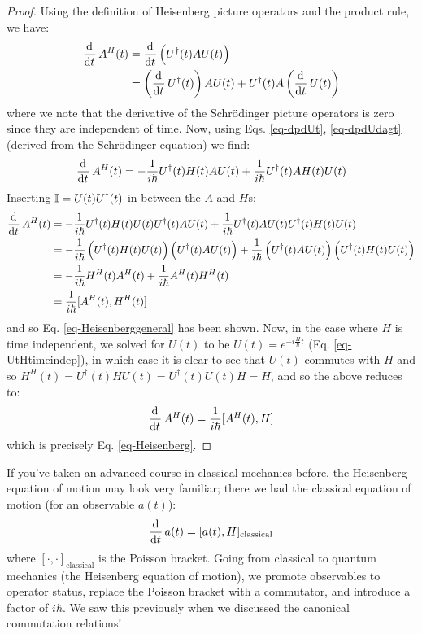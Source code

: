 \begin{proof}
    Using the definition of Heisenberg picture operators and the product rule, we have:
    \begin{equation}
        \begin{split}
            \dod{}{t}A^H(t) &= \dod{}{t}\left(U^\dag(t) A U(t)\right)
            \\ &= \left(\dod{}{t}U^\dag(t)\right)A U(t) + U^\dag(t) A \left(\dod{}{t}U(t)\right)
        \end{split}
    \end{equation}
    where we note that the derivative of the Schr\"{o}dinger picture operators is zero since they are independent of time. Now, using Eqs. \eqref{eq-dpdUt}, \eqref{eq-dpdUdagt} (derived from the Schr\"{o}dinger equation) we find:
    \begin{equation}
        \dod{}{t}A^H(t) = -\frac{1}{i\hbar}U^\dag(t) H(t) A U(t) + \frac{1}{i\hbar}U^\dag(t) A H(t) U(t)
    \end{equation}
    Inserting $\mathbb{I} = U(t)U^\dag(t)$ in between the $A$ and $H$s:
    \begin{equation}
        \begin{split}
            \dod{}{t}A^H(t) &= -\frac{1}{i\hbar}U^\dag(t) H(t) U(t)U^\dag(t) A U(t) + \frac{1}{i\hbar}U^\dag(t) A U(t)U^\dag(t) H(t) U(t)
            \\ &= -\frac{1}{i\hbar}\left(U^\dag(t) H(t) U(t)\right)\left(U^\dag(t) A U(t)\right) + \frac{1}{i\hbar}\left(U^\dag(t) A U(t)\right)\left(U^\dag(t) H(t) U(t)\right)
            \\ &= -\frac{1}{i\hbar} H^H(t)A^H(t) + \frac{1}{i\hbar}A^H(t) H^H(t)
            \\ &= \frac{1}{i\hbar}[A^H(t), H^H(t)]
        \end{split}
    \end{equation}
    and so Eq. \eqref{eq-Heisenberggeneral} has been shown. Now, in the case where $H$ is time independent, we solved for $U(t)$ to be $U(t) = e^{-i\frac{H}{\hbar}t}$ (Eq. \eqref{eq-UtHtimeindep}), in which case it is clear to see that $U(t)$ commutes with $H$ and so $H^H(t) = U^\dag(t) H U(t) = U^\dag(t) U(t) H = H$, and so the above reduces to:
    \begin{equation}
        \dod{}{t}A^H(t) = \frac{1}{i\hbar}[A^H(t), H]
    \end{equation}
    which is precisely Eq. \eqref{eq-Heisenberg}.
\end{proof}

If you've taken an advanced course in classical mechanics before, the Heisenberg equation of motion may look very familiar; there we had the classical equation of motion (for an observable $a(t)$):
\begin{equation}
    \dod{}{t}a(t) = [a(t), H]_{\text{classical}}
\end{equation}
where $[\cdot, \cdot]_{\text{classical}}$ is the Poisson bracket. Going from classical to quantum mechanics (the Heisenberg equation of motion), we promote observables to operator status, replace the Poisson bracket with a commutator, and introduce a factor of $i\hbar$. We saw this previously when we discussed the canonical commutation relations!


